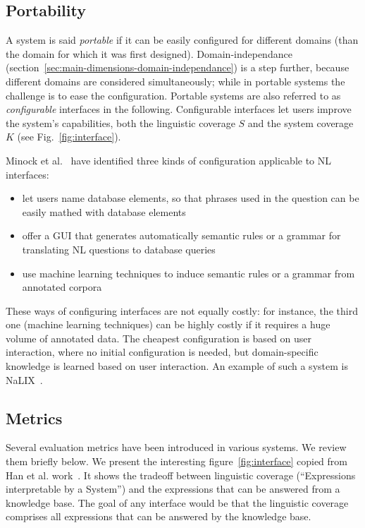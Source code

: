\documentclass[10pt,journal,letterpaper,compsoc]{IEEEtran}
\begin{document}
\subsection{Portability}
\label{sec:main-dimensions-portability}
A system is said \emph{portable} if it can be easily configured for different
domains (than the domain for which it was first designed).
Domain-independance (section~\ref{sec:main-dimensions-domain-independance}) is a
step further, because different domains are considered simultaneously; while in
portable systems the challenge is to ease the configuration.
Portable systems are also referred to as \emph{configurable} interfaces in the
following.
Configurable interfaces let users improve the system's capabilities, both the
linguistic coverage $S$ and the system coverage $K$ (see
Fig.~\ref{fig:interface}).


Minock et al.~\cite{Minock:2010:CSB:1715942.1716190} have identified three kinds
of configuration applicable to NL interfaces:
\begin{itemize}
  \item let users name database elements, so that phrases used in the question
  can be easily mathed with database elements
  \item offer a GUI that generates automatically semantic rules or a grammar for
  translating NL questions to database queries
  \item use machine learning techniques to induce semantic rules or a grammar
  from annotated corpora
\end{itemize}
These ways of configuring interfaces are not equally costly: for instance, the
third one (machine learning techniques) can be highly costly if it requires a
huge volume of annotated data. The cheapest configuration is based on user
interaction, where no initial configuration is needed, but domain-specific
knowledge is learned based on user interaction. An example of such a
system is {\sc NaLIX}~\cite{Li:2005:NIN:1066157.1066281}.




\subsection{Metrics}
\label{sec:big-picture-metrics}
Several evaluation metrics have been introduced in various systems. We review
them briefly below.
We present the interesting figure~\ref{fig:interface} copied from Han et al.
work~\cite{Han:2010:NLI:1719970.1720022}. It shows the tradeoff between
linguistic coverage (``Expressions interpretable by a System'') and the
expressions that can be answered from a knowledge base. The goal of any
interface would be that the linguistic coverage comprises all expressions that
can be answered by the knowledge base.
\end{document}
